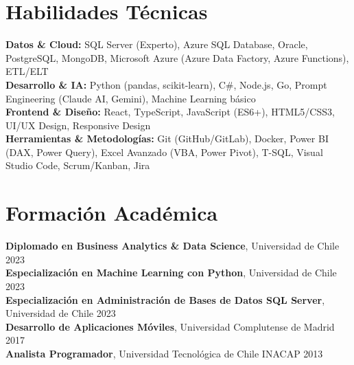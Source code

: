 \documentclass[11pt,letterpaper]{article}
\begin{document}
\section{Habilidades T\'{e}cnicas}
\textbf{Datos \& Cloud:} SQL Server (Experto), Azure SQL Database, Oracle, PostgreSQL, MongoDB, Microsoft Azure (Azure Data Factory, Azure Functions), ETL/ELT \\
\textbf{Desarrollo \& IA:} Python (pandas, scikit-learn), C\#, Node.js, Go, Prompt Engineering (Claude AI, Gemini), Machine Learning básico \\
\textbf{Frontend \& Diseño:} React, TypeScript, JavaScript (ES6+), HTML5/CSS3, UI/UX Design, Responsive Design \\
\textbf{Herramientas \& Metodologías:} Git (GitHub/GitLab), Docker, Power BI (DAX, Power Query), Excel Avanzado (VBA, Power Pivot), T-SQL, Visual Studio Code, Scrum/Kanban, Jira

\section{Formaci\'{o}n Acad\'{e}mica}
\textbf{Diplomado en Business Analytics \& Data Science}, Universidad de Chile \hfill 2023 \\
\textbf{Especialización en Machine Learning con Python}, Universidad de Chile \hfill 2023 \\
\textbf{Especialización en Administración de Bases de Datos SQL Server}, Universidad de Chile \hfill 2023 \\
\textbf{Desarrollo de Aplicaciones Móviles}, Universidad Complutense de Madrid \hfill 2017 \\
\textbf{Analista Programador}, Universidad Tecnológica de Chile INACAP \hfill 2013
\end{document}
